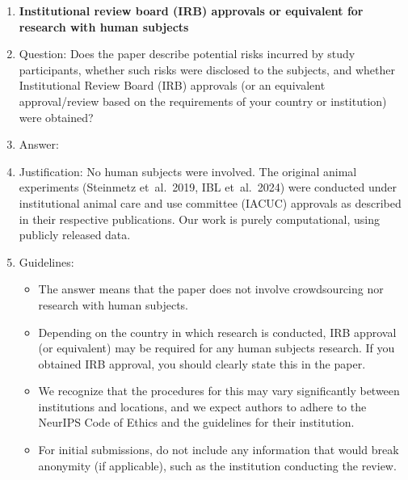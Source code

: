 \begin{enumerate}
\item {\bf Institutional review board (IRB) approvals or equivalent for research with human subjects}
    \item[] Question: Does the paper describe potential risks incurred by study participants, whether such risks were disclosed to the subjects, and whether Institutional Review Board (IRB) approvals (or an equivalent approval/review based on the requirements of your country or institution) were obtained?
    \item[] Answer: \answerNA{}
    \item[] Justification: No human subjects were involved.  The
      original animal experiments (Steinmetz et~al.\ 2019, IBL et~al.\ 2024)
      were conducted under institutional animal care and use
      committee (IACUC) approvals as described in their respective
      publications.  Our work is purely computational, using
      publicly released data.
    \item[] Guidelines:
    \begin{itemize}
        \item The answer \answerNA{} means that the paper does not involve crowdsourcing nor research with human subjects.
        \item Depending on the country in which research is conducted, IRB approval (or equivalent) may be required for any human subjects research. If you obtained IRB approval, you should clearly state this in the paper. 
        \item We recognize that the procedures for this may vary significantly between institutions and locations, and we expect authors to adhere to the NeurIPS Code of Ethics and the guidelines for their institution. 
        \item For initial submissions, do not include any information that would break anonymity (if applicable), such as the institution conducting the review.
    \end{itemize}


\end{enumerate}
